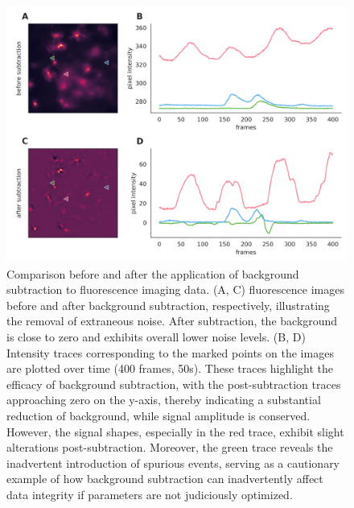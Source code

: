 \begin{figure}[!htb]
\begin{center}
\includegraphics[width=\linewidth]{figures/4.png}
\end{center}
\caption{
Comparison before and after the application of background subtraction to fluorescence imaging data. (A, C) fluorescence images before and after background subtraction, respectively, illustrating the removal of extraneous noise. After subtraction, the background is close to zero and exhibits overall lower noise levels. (B, D) Intensity traces corresponding to the marked points on the images are plotted over time (400 frames, 50s). These traces highlight the efficacy of background subtraction, with the post-subtraction traces approaching zero on the y-axis, thereby indicating a substantial reduction of background, while signal amplitude is conserved. However, the signal shapes, especially in the red trace, exhibit slight alterations post-subtraction. Moreover, the green trace reveals the inadvertent introduction of spurious events, serving as a cautionary example of how background subtraction can inadvertently affect data integrity if parameters are not judiciously optimized.
}\label{fig:4}
\end{figure}

